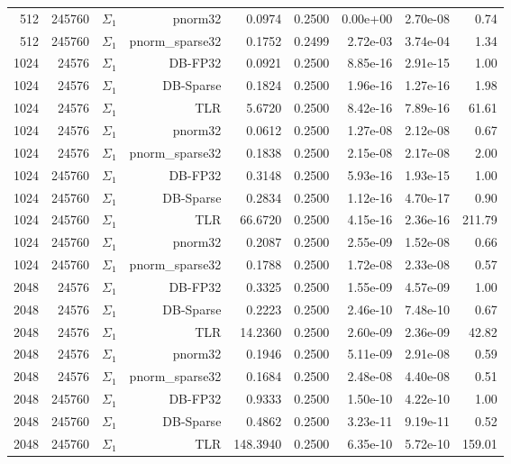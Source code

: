 \begin{tabular}{|r|r|r|r|r|r|r|r|r|}
  512 & 245760 & $\Sigma_1$ & pnorm32 & 0.0974 & 0.2500 & 0.00e+00 & 2.70e-08 & 0.74 \\
  512 & 245760 & $\Sigma_1$ & pnorm\_sparse32 & 0.1752 & 0.2499 & 2.72e-03 & 3.74e-04 & 1.34 \\
  1024 & 24576 & $\Sigma_1$ & DB-FP32 & 0.0921 & 0.2500 & 8.85e-16 & 2.91e-15 & 1.00 \\
  1024 & 24576 & $\Sigma_1$ & DB-Sparse & 0.1824 & 0.2500 & 1.96e-16 & 1.27e-16 & 1.98 \\
  1024 & 24576 & $\Sigma_1$ & TLR & 5.6720 & 0.2500 & 8.42e-16 & 7.89e-16 & 61.61 \\
  1024 & 24576 & $\Sigma_1$ & pnorm32 & 0.0612 & 0.2500 & 1.27e-08 & 2.12e-08 & 0.67 \\
  1024 & 24576 & $\Sigma_1$ & pnorm\_sparse32 & 0.1838 & 0.2500 & 2.15e-08 & 2.17e-08 & 2.00 \\
  1024 & 245760 & $\Sigma_1$ & DB-FP32 & 0.3148 & 0.2500 & 5.93e-16 & 1.93e-15 & 1.00 \\
  1024 & 245760 & $\Sigma_1$ & DB-Sparse & 0.2834 & 0.2500 & 1.12e-16 & 4.70e-17 & 0.90 \\
  1024 & 245760 & $\Sigma_1$ & TLR & 66.6720 & 0.2500 & 4.15e-16 & 2.36e-16 & 211.79 \\
  1024 & 245760 & $\Sigma_1$ & pnorm32 & 0.2087 & 0.2500 & 2.55e-09 & 1.52e-08 & 0.66 \\
  1024 & 245760 & $\Sigma_1$ & pnorm\_sparse32 & 0.1788 & 0.2500 & 1.72e-08 & 2.33e-08 & 0.57 \\
  2048 & 24576 & $\Sigma_1$ & DB-FP32 & 0.3325 & 0.2500 & 1.55e-09 & 4.57e-09 & 1.00 \\
  2048 & 24576 & $\Sigma_1$ & DB-Sparse & 0.2223 & 0.2500 & 2.46e-10 & 7.48e-10 & 0.67 \\
  2048 & 24576 & $\Sigma_1$ & TLR & 14.2360 & 0.2500 & 2.60e-09 & 2.36e-09 & 42.82 \\
  2048 & 24576 & $\Sigma_1$ & pnorm32 & 0.1946 & 0.2500 & 5.11e-09 & 2.91e-08 & 0.59 \\
  2048 & 24576 & $\Sigma_1$ & pnorm\_sparse32 & 0.1684 & 0.2500 & 2.48e-08 & 4.40e-08 & 0.51 \\
  2048 & 245760 & $\Sigma_1$ & DB-FP32 & 0.9333 & 0.2500 & 1.50e-10 & 4.22e-10 & 1.00 \\
  2048 & 245760 & $\Sigma_1$ & DB-Sparse & 0.4862 & 0.2500 & 3.23e-11 & 9.19e-11 & 0.52 \\
  2048 & 245760 & $\Sigma_1$ & TLR & 148.3940 & 0.2500 & 6.35e-10 & 5.72e-10 & 159.01 \\

\end{tabular}
